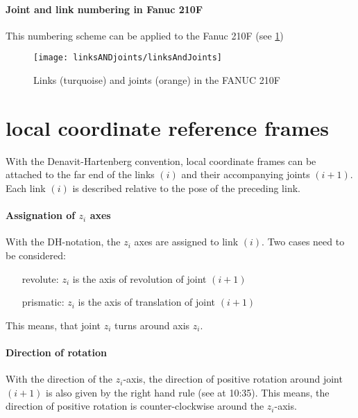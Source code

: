 \paragraph{Joint and link numbering in Fanuc 210F}

This numbering scheme can be applied to the Fanuc 210F (see \ref{fig:LinksANDJoints210F}) 


\begin{figure}[H]
	\texttt{[image: linksANDjoints/linksAndJoints]}
	\caption{Links (turquoise) and joints (orange) in the FANUC 210F}
	\label{fig:LinksANDJoints210F}
\end{figure}



\section{local coordinate reference frames}
With the Denavit-Hartenberg convention, local coordinate frames can be attached to the far end of the links $ (i) $ and their accompanying joints $ (i+1) $.
Each link $(i)$ is described relative to the pose of the preceding link.



\paragraph{Assignation of $z_i$ axes}

With the DH-notation, the $z_i$ axes are assigned to link $(i)$.
Two cases need to be considered: %
\begin{itemize}
	\item[revolute:] $z_i$ is the axis of revolution of joint $(i+1)$
	\item[prismatic:] $z_i$ is the axis of translation of joint $(i+1)$
\end{itemize}
This means, that joint $z_i$ turns around axis $z_i$.

\paragraph{Direction of rotation}
With the direction of the $z_i$-axis, the direction of positive rotation around joint $(i+1)$ is also given by the right hand rule (see \cite{Angela_U1S2P1} at 10:35). This means, the direction of positive rotation is counter-clockwise around the $z_i$-axis.

